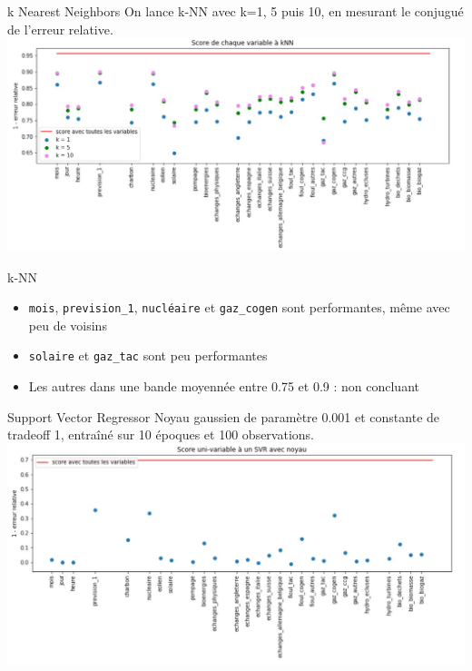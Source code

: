 \begin{frame}{k Nearest Neighbors}
\protect\hypertarget{k-nearest-neighbors}{}
On lance k-NN avec k=1, 5 puis 10, en mesurant le conjugué de l'erreur
relative. \includegraphics[scale=.5]{figures/knn.JPG}
\end{frame}

\begin{frame}[fragile]{k-NN}
\protect\hypertarget{k-nn}{}
\begin{itemize}
\tightlist
\item
  \texttt{mois}, \texttt{prevision\_1}, \texttt{nucléaire} et
  \texttt{gaz\_cogen} sont performantes, même avec peu de voisins
\item
  \texttt{solaire} et \texttt{gaz\_tac} sont peu performantes
\item
  Les autres dans une bande moyennée entre 0.75 et 0.9 : non concluant
\end{itemize}
\end{frame}

\begin{frame}{Support Vector Regressor}
\protect\hypertarget{support-vector-regressor}{}
Noyau gaussien de paramètre 0.001 et constante de tradeoff 1, entraîné
sur 10 époques et 100 observations.
\includegraphics[scale=.5]{figures/svr.JPG}
\end{frame}

